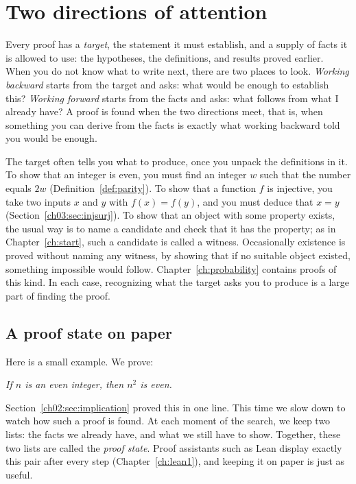 \section{Two directions of attention}\label{ch04:sec:directions}
Every proof has a \emph{target}, the statement it must establish, and a supply of facts it is allowed to use: the hypotheses, the definitions, and results proved earlier. When you do not know what to write next, there are two places to look. \emph{Working backward} starts from the target and asks: what would be enough to establish this? \emph{Working forward} starts from the facts and asks: what follows from what I already have? A proof is found when the two directions meet, that is, when something you can derive from the facts is exactly what working backward told you would be enough.

The target often tells you what to produce, once you unpack the definitions in it. To show that an integer is even, you must find an integer $w$ such that the number equals $2w$ (Definition~\ref{def:parity}). To show that a function $f$ is injective, you take two inputs $x$ and $y$ with $f(x)=f(y)$, and you must deduce that $x=y$ (Section~\ref{ch03:sec:injsurj}). To show that an object with some property exists, the usual way is to name a candidate and check that it has the property; as in Chapter~\ref{ch:start}, such a candidate is called a witness. Occasionally existence is proved without naming any witness, by showing that if no suitable object existed, something impossible would follow. Chapter~\ref{ch:probability} contains proofs of this kind. In each case, recognizing what the target asks you to produce is a large part of finding the proof.

\subsection*{A proof state on paper}
Here is a small example. We prove:
\begin{center}
\emph{If $n$ is an even integer, then $n^2$ is even.}
\end{center}
Section~\ref{ch02:sec:implication} proved this in one line. This time we slow down to watch how such a proof is found. At each moment of the search, we keep two lists: the facts we already have, and what we still have to show. Together, these two lists are called the \emph{proof state}. Proof assistants such as Lean display exactly this pair after every step (Chapter~\ref{ch:lean1}), and keeping it on paper is just as useful.

